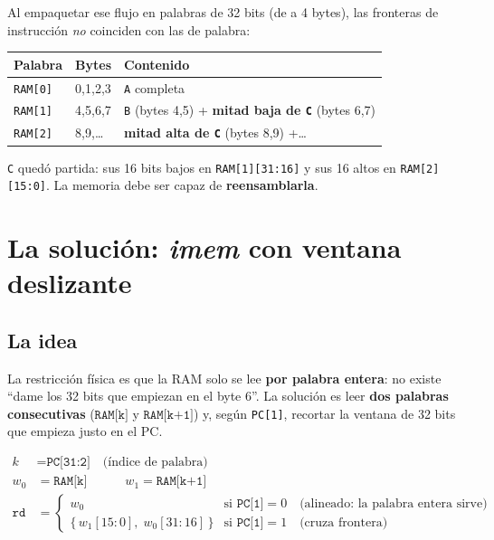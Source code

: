 \documentclass[11pt]{article}
\newcommand{\code}[1]{\texttt{#1}}
\begin{document}
\noindent
Al empaquetar ese flujo en palabras de 32 bits (de a 4 bytes), las fronteras de
instrucción \emph{no} coinciden con las de palabra:

\begin{center}
\small
\begin{tabular}{@{}lll@{}}
\toprule
Palabra & Bytes & Contenido \\
\midrule
\code{RAM[0]} & 0,1,2,3 & \code{A} completa \\
\code{RAM[1]} & 4,5,6,7 & \code{B} (bytes 4,5) \;+\; \textbf{mitad baja de \code{C}} (bytes 6,7) \\
\code{RAM[2]} & 8,9,\dots & \textbf{mitad alta de \code{C}} (bytes 8,9) \;+\;\dots \\
\bottomrule
\end{tabular}
\end{center}

\noindent
\code{C} quedó partida: sus 16 bits bajos en \code{RAM[1][31:16]} y sus 16 altos
en \code{RAM[2][15:0]}. La memoria debe ser capaz de \textbf{reensamblarla}.

\section{La solución: \emph{imem} con ventana deslizante}

\subsection{La idea}

La restricción física es que la RAM solo se lee \textbf{por palabra entera}: no
existe ``dame los 32 bits que empiezan en el byte 6''. La solución es leer
\textbf{dos palabras consecutivas} ($\code{RAM[k]}$ y $\code{RAM[k+1]}$) y, según
\code{PC[1]}, recortar la ventana de 32 bits que empieza justo en el PC.

\begin{align*}
k    &= \code{PC[31:2]} \quad\text{(índice de palabra)}\\
w_0  &= \code{RAM[k]} \qquad\quad w_1 = \code{RAM[k+1]}\\[2pt]
\code{rd} &=
\begin{cases}
w_0 & \text{si } \code{PC[1]}=0 \quad\text{(alineado: la palabra entera sirve)}\\[2pt]
\{\,w_1[15{:}0],\; w_0[31{:}16]\,\} & \text{si } \code{PC[1]}=1 \quad\text{(cruza frontera)}
\end{cases}
\end{align*}
\end{document}
